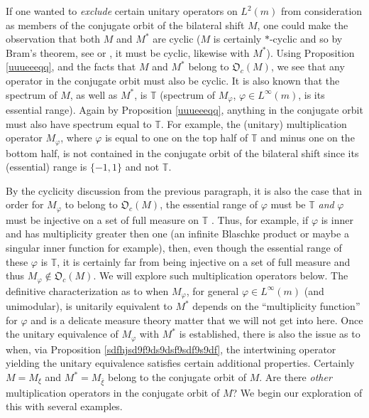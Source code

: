 \documentclass{dis}
\theoremstyle{plain}
\theoremstyle{definition}
\def\T{\mathbb{T}}
\renewcommand{\phi}{\varphi}
\newcommand{\0}{{\color{lightgray}0}}
\begin{document}
If one wanted to {\em exclude} certain unitary operators on $L^2(m)$ from consideration as members of the conjugate orbit of the bilateral shift $M$, one could make the observation that both $M$ and $M^{*}$ are cyclic ($M$ is certainly $*$-cyclic and so by Bram's theorem, see \cite{MR68129} or \cite[p.~232]{MR1112128}, it must be cyclic, likewise with $M^{*}$). Using Proposition \ref{uuueeeqq}, and the facts that $M$ and $M^{*}$ belong to $\mathfrak{O}_c(M)$, we see that any operator  in the conjugate orbit must also be cyclic. It is also known that the spectrum of $M$, as well as $M^{*}$, is $\T$ \cite[p.~178]{MR4545809} (spectrum of $M_{\phi}$, $\phi \in L^{\infty}(m)$, is its essential range). Again by Proposition \ref{uuueeeqq}, anything in the conjugate orbit must  also have spectrum equal to $\T$. For example, the (unitary) multiplication operator $M_{\phi}$, where $\phi$ is equal to one on the top half of $\T$ and minus one on the bottom half, is not contained in the conjugate orbit of the bilateral shift since its (essential) range is $\{-1, 1\}$ and not $\T$.

 By the cyclicity discussion from the previous paragraph,  it is also the case that in order for $M_{\phi}$ to belong to $\mathfrak{O}_c(M)$,  the essential range of $\phi$ must be $\T$ {\em and} $\phi$ must be injective on a set of full measure on $\T$ \cite{MR361898, MR3292513}.  Thus, for example, if $\phi$ is inner and has multiplicity greater then one (an infinite Blaschke product or maybe a singular inner function for example), then, even though the essential range of these $\phi$ is $\T$, it is certainly  far from being injective on a set of full measure and thus $M_{\phi} \not \in \mathfrak{O}_c(M)$. We will explore such multiplication operators below. The definitive characterization as to when $M_{\phi}$, for general $\phi \in L^{\infty}(m)$ (and unimodular),  is unitarily equivalent to $M^{*}$ depends on the ``multiplicity function'' for $\phi$ and is a delicate measure theory matter \cite{MR526530, MR320797} that we will not get into here. Once the unitary equivalence of $M_{\phi}$ with $M^{*}$ is established, there is also the issue as to when, via Proposition \ref{sdfhjsd9f9ds9dsf9sdf9s9df}, the intertwining operator yielding the unitary equivalence satisfies certain additional properties. Certainly  $M = M_{\xi}$ and $M^{*} = M_{\bar \xi}$ belong to the conjugate orbit of $M$. Are there {\em other} multiplication operators in the conjugate orbit of $M$?  We begin our exploration of this with several examples.  
  
\end{document}
